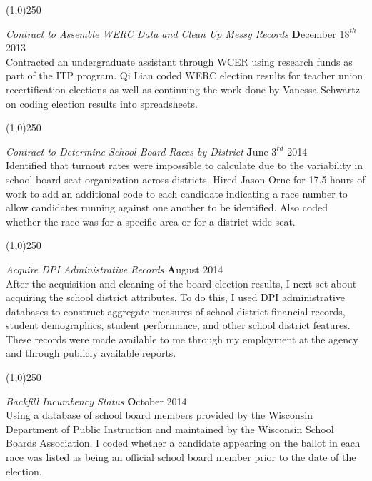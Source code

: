 \begin{center}
\line(1,0){250}
\end{center}

{\em Contract to Assemble WERC Data and Clean Up Messy Records} \hfill {\textbf December $18^{th}$ 2013}\\

Contracted an undergraduate assistant through WCER using research funds as part 
of the ITP program. Qi Lian coded WERC election results for teacher union
recertification elections as well as continuing the work done by Vanessa Schwartz 
on coding election results into spreadsheets. 

\begin{center}
\line(1,0){250}
\end{center}

{\em Contract to Determine School Board Races by District} \hfill {\textbf June $3^{rd}$ 2014}\\
 
Identified that turnout rates were impossible to calculate due to the variability 
in school board seat organization across districts. Hired Jason Orne for 17.5 
hours of work to add an additional code to each candidate indicating 
a race number to allow candidates running against one another to be identified. 
Also coded whether the race was for a specific area or for a district wide seat. 

\begin{center}
\line(1,0){250}
\end{center}

{\em Acquire DPI Administrative Records} \hfill {\textbf August 2014}\\

After the acquisition and cleaning of the board election results, I next set 
about acquiring the school district attributes. To do this, I used DPI 
administrative databases to construct aggregate measures of school district 
financial records, student demographics, student performance, and other 
school district features. These records were made available to me through my 
employment at the agency and through publicly available reports. 

\begin{center}
\line(1,0){250}
\end{center}

{\em Backfill Incumbency Status} \hfill {\textbf October 2014}\\

Using a database of school board members provided by the Wisconsin Department 
of Public Instruction and maintained by the Wisconsin School Boards Association, 
I coded whether a candidate appearing on the ballot in each race was listed as 
being an official school board member prior to the date of the election. 

